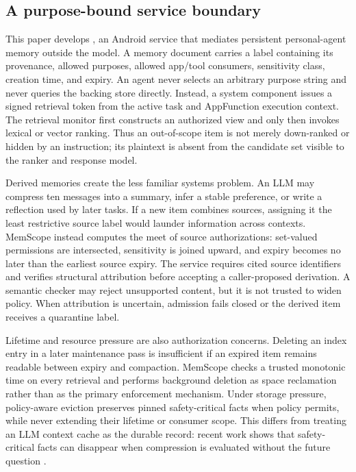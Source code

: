 \subsection{A purpose-bound service boundary}

This paper develops \ms, an Android service that mediates persistent personal-agent memory outside the model. A memory document carries a label containing its provenance, allowed purposes, allowed app/tool consumers, sensitivity class, creation time, and expiry. An agent never selects an arbitrary purpose string and never queries the backing store directly. Instead, a system component issues a signed retrieval token from the active task and AppFunction execution context. The retrieval monitor first constructs an authorized view and only then invokes lexical or vector ranking. Thus an out-of-scope item is not merely down-ranked or hidden by an instruction; its plaintext is absent from the candidate set visible to the ranker and response model.

Derived memories create the less familiar systems problem. An LLM may compress ten messages into a summary, infer a stable preference, or write a reflection used by later tasks. If a new item combines sources, assigning it the least restrictive source label would launder information across contexts. MemScope instead computes the meet of source authorizations: set-valued permissions are intersected, sensitivity is joined upward, and expiry becomes no later than the earliest source expiry. The service requires cited source identifiers and verifies structural attribution before accepting a caller-proposed derivation. A semantic checker may reject unsupported content, but it is not trusted to widen policy. When attribution is uncertain, admission fails closed or the derived item receives a quarantine label.

Lifetime and resource pressure are also authorization concerns. Deleting an index entry in a later maintenance pass is insufficient if an expired item remains readable between expiry and compaction. MemScope checks a trusted monotonic time on every retrieval and performs background deletion as space reclamation rather than as the primary enforcement mechanism. Under storage pressure, policy-aware eviction preserves pinned safety-critical facts when policy permits, while never extending their lifetime or consumer scope. This differs from treating an LLM context cache as the durable record: recent work shows that safety-critical facts can disappear when compression is evaluated without the future question \citep{zhu2026allergy}.

